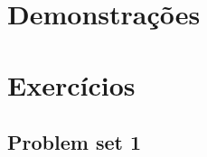 \documentclass[12pt, a4paper]{article}
\begin{document}

\pagebreak
\tableofcontents
\pagebreak

\section{Demonstrações}



\pagebreak

\section{Exercícios}
\subsection{Problem set 1}

\end{document}
